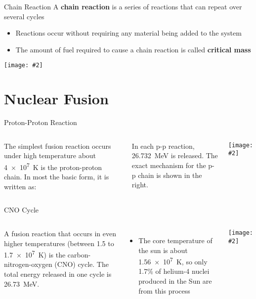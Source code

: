 \documentclass[12pt,compress,aspectratio=169]{beamer}
\newcommand{\pic}[2]{\texttt{[image: \#2]}}
\newcommand{\eq}[2]{
  \vspace{#1}{\Large\begin{displaymath}#2\end{displaymath}}
}
\begin{document}
\begin{frame}{Chain Reaction}
  A \textbf{chain reaction} is a series of reactions that can repeat over
  several cycles
  \begin{itemize}
  \item Reactions occur without requiring any material being added to the
    system %
  \item The amount of fuel required to cause a chain reaction is called
    \textbf{critical mass}
  \end{itemize}
  \begin{center}
    \pic{.6}{graphics/chain-reaction}
  \end{center}
\end{frame}



\section{Nuclear Fusion}

\begin{frame}{Proton-Proton Reaction}
  \begin{columns}
    The simplest fusion reaction occurs under high temperature about
    \SI{4e7}{\kelvin} is the proton-proton chain. In most the basic form, it is
    written as:

    \eq{-.35in}{
      \ce{4(^1_1H) -> ^4_2He + 2(^0_{+1}e) + \text{energy}}
    }
    
    \vspace{-.2in}In each p-p reaction, \SI{26.732}{\mega\electronvolt} is
    released. The exact mechanism for the p-p chain is shown in the right.
    
    \pic{1}{graphics/Fusion_in_the_Sun}
  \end{columns}
\end{frame}



\begin{frame}{CNO Cycle}
  \begin{columns}
    A fusion reaction that occurs in even higher temperatures (between 1.5 to
    \SI{1.7e7}{\kelvin}) is the carbon-nitrogen-oxygen (CNO) cycle. The total
    energy released in one cycle is \SI{26.73}{\mega\electronvolt}.
    \begin{itemize}
    \item The core temperature of the sun is about \SI{1.56e7}{\kelvin}, so
      only 1.7\% of helium-4 nuclei produced in the Sun are from this process
    \end{itemize}
    \pic{1.1}{graphics/CNO-Cycle}
  \end{columns}
\end{frame}
\end{document}
